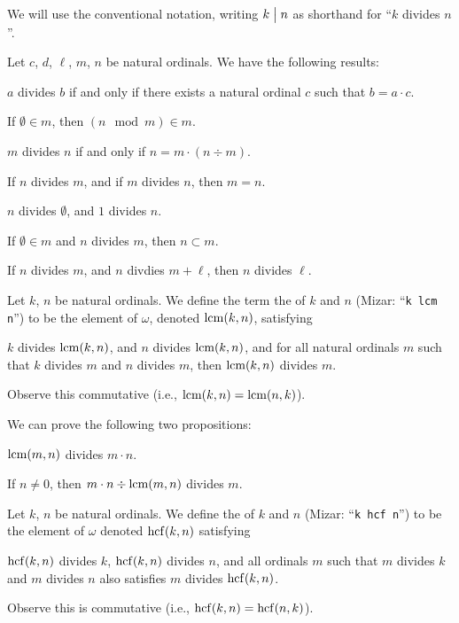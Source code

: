 \documentclass{article}
\begin{document}
\begin{remark}
We will use the conventional notation, writing $k\divides n$ as
shorthand for ``$k$ divides $n$''.
\end{remark}

Let $c$, $d$, $\ell$, $m$, $n$ be natural ordinals.
We have the following results:
\begin{thm}
\item\label{arytm3:5} $a$ divides $b$ if and only if there exists a natural
  ordinal $c$ such that $b=a\cdot c$.
\item\label{arytm3:6} If $\emptyset\in m$, then $(n\mod{m})\in m$.
\item\label{arytm3:7} $m$ divides $n$ if and only if $n=m\cdot(n\div m)$.
\item\label{arytm3:8} If $n$ divides $m$, and if $m$ divides $n$, then $m=n$.
\item\label{arytm3:9} $n$ divides $\emptyset$, and $1$ divides $n$.
\item\label{arytm3:10} If $\emptyset\in m$ and $n$ divides $m$, then
  $n\subset m$.
\item\label{arytm3:11} If $n$ divides $m$, and $n$ divdies $m+\ell$,
  then $n$ divides $\ell$.
\end{thm}

\begin{definition}
Let $k$, $n$ be natural ordinals.
We define the term the  of $k$ and $n$ (Mizar:
``\verb#k lcm n#'') to be the element of $\omega$, denoted $\operatorname{lcm}(k,n)$,
satisfying
\begin{defn}
\item $k$ divides $\operatorname{lcm}(k,n)$, and $n$ divides $\operatorname{lcm}(k,n)$, and for all
  natural ordinals $m$ such that $k$ divides $m$ and $n$ divides $m$,
  then $\operatorname{lcm}(k,n)$ divides $m$.
\end{defn}
Observe this commutative (i.e., $\operatorname{lcm}(k,n)=\operatorname{lcm}(n,k)$).
\end{definition}

We can prove the following two propositions:
\begin{thm}
\item\label{arytm3:12} $\operatorname{lcm}(m,n)$ divides $m\cdot n$.
\item\label{arytm3:13} If $n\neq 0$, then $m\cdot n\div\operatorname{lcm}(m,n)$
  divides $m$.
\end{thm}

\begin{definition}
Let $k$, $n$ be natural ordinals.
We define the  of $k$ and $n$ (Mizar:
``\verb#k hcf n#'') to be the element of $\omega$ denoted $\operatorname{hcf}(k,n)$
satisfying
\begin{defn}
\item $\operatorname{hcf}(k,n)$ divides $k$, $\operatorname{hcf}(k,n)$ divides $n$, and all
  ordinals $m$ such that $m$ divides $k$ and $m$ divides $n$ also
  satisfies $m$ divides $\operatorname{hcf}(k,n)$.
\end{defn}
Observe this is commutative (i.e., $\operatorname{hcf}(k,n)=\operatorname{hcf}(n,k)$).
\end{definition}
\end{document}

